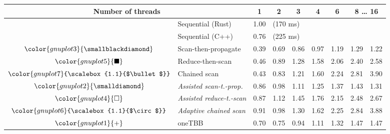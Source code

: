 \begin{tabular}{clrrrrrrr}
\toprule
\multicolumn{2}{c}{\textbf{Number of threads}} & \multicolumn{1}{c}{\textbf{ 1 }} & \multicolumn{1}{c}{\textbf{ 2 }} & \multicolumn{1}{c}{\textbf{ 3 }} & \multicolumn{1}{c}{\textbf{ 4 }} & \multicolumn{1}{c}{\textbf{ 6 }} & \multicolumn{2}{c}{\textbf{ 8 } \dots \textbf{ 16 }} \\
\midrule
& Sequential (Rust) & \multicolumn{1}{r}{ 1.00 } & \multicolumn{ 6 }{l}{(170 ms)} \\
& Sequential (C++) & \multicolumn{1}{r}{ 0.76 } & \multicolumn{ 6 }{l}{(225 ms)} \\
\rowcolor{gnuplot3!10}$\color{gnuplot3}{\smallblackdiamond}$ & Scan-then-propagate & \cellcolor{gnuplot3!10} 0.39 & \cellcolor{gnuplot3!10} 0.69 & \cellcolor{gnuplot3!10} 0.86 & \cellcolor{gnuplot3!10} 0.97 & \cellcolor{gnuplot3!10} 1.19 & \cellcolor{gnuplot3!10} 1.29 & \cellcolor{gnuplot3!10} 1.22 \\
\rowcolor{gnuplot5!10}$\color{gnuplot5}{\blacksquare}$ & Reduce-then-scan & \cellcolor{gnuplot5!10} 0.46 & \cellcolor{gnuplot5!10} 0.89 & \cellcolor{gnuplot5!10} 1.28 & \cellcolor{gnuplot5!10} 1.58 & \cellcolor{gnuplot5!10} 2.06 & \cellcolor{gnuplot5!10} 2.40 & \cellcolor{gnuplot5!10} 2.58 \\
\rowcolor{gnuplot7!10}$\color{gnuplot7}{\scalebox{1.1}{$\bullet$}}$ & Chained scan & \cellcolor{gnuplot7!10} 0.43 & \cellcolor{gnuplot7!10} 0.83 & \cellcolor{gnuplot7!10} 1.21 & \cellcolor{gnuplot7!10} 1.60 & \cellcolor{gnuplot7!10} 2.24 & \cellcolor{gnuplot7!10} 2.81 & \cellcolor{gnuplot7!10} 3.90 \\
\rowcolor{gnuplot2!30}$\color{gnuplot2}{\smalldiamond}$ & \textit{Assisted scan-t.-prop.} & \cellcolor{gnuplot2!30} 0.86 & \cellcolor{gnuplot2!30} 0.98 & \cellcolor{gnuplot2!30} 1.11 & \cellcolor{gnuplot2!30} 1.25 & \cellcolor{gnuplot2!30} 1.37 & \cellcolor{gnuplot2!30} 1.43 & \cellcolor{gnuplot2!30} 1.31 \\
\rowcolor{gnuplot4!30}$\color{gnuplot4}{\square}$ & \textit{Assisted reduce-t.-scan} & \cellcolor{gnuplot4!30} 0.87 & \cellcolor{gnuplot4!30} 1.12 & \cellcolor{gnuplot4!30} 1.45 & \cellcolor{gnuplot4!30} 1.76 & \cellcolor{gnuplot4!30} 2.15 & \cellcolor{gnuplot4!30} 2.48 & \cellcolor{gnuplot4!30} 2.67 \\
\rowcolor{gnuplot6!30}$\color{gnuplot6}{\scalebox{1.1}{$\circ$}}$ & \textit{Adaptive chained scan} & \cellcolor{gnuplot6!30} 0.91 & \cellcolor{gnuplot6!30} 0.98 & \cellcolor{gnuplot6!30} 1.30 & \cellcolor{gnuplot6!30} 1.62 & \cellcolor{gnuplot6!30} 2.25 & \cellcolor{gnuplot6!30} 2.84 & \cellcolor{gnuplot6!30} 3.88 \\
\rowcolor{gnuplot1!10}$\color{gnuplot1}{+}$ & oneTBB & \cellcolor{gnuplot1!10} 0.70 & \cellcolor{gnuplot1!10} 0.75 & \cellcolor{gnuplot1!10} 0.94 & \cellcolor{gnuplot1!10} 1.11 & \cellcolor{gnuplot1!10} 1.32 & \cellcolor{gnuplot1!10} 1.47 & \cellcolor{gnuplot1!10} 1.47 \\
\bottomrule
\end{tabular}
